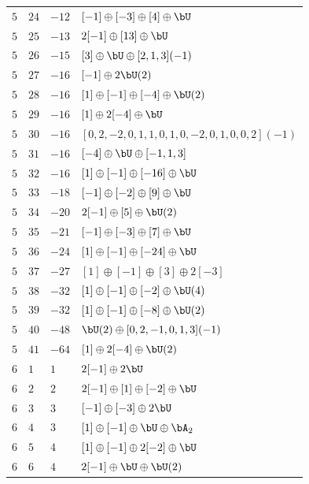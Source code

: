 \begin{center}
\begin{longtable}{llll}
 \(5\) & \(24\) & \(-12\) & \([-1] \oplus [-3] \oplus [4] \oplus \bU\) \\
 \(5\) & \(25\) & \(-13\) & \(2 [-1] \oplus [13] \oplus \bU\) \\
 \(5\) & \(26\) & \(-15\) & \([3] \oplus \bU \oplus [2, 1, 3](-1)\) \\
 \(5\) & \(27\) & \(-16\) & \([-1] \oplus 2 \bU(2)\) \\
 \(5\) & \(28\) & \(-16\) & \([1] \oplus [-1] \oplus [-4] \oplus \bU(2)\) \\
 \(5\) & \(29\) & \(-16\) & \([1] \oplus 2 [-4] \oplus \bU\) \\
 \(5\) & \(30\) & \(-16\) & \([0, 2, -2, 0, 1, 1, 0, 1, 0, -2, 0, 1, 0, 0, 2](-1)\) \\
 \(5\) & \(31\) & \(-16\) & \([-4] \oplus \bU \oplus [-1, 1, 3]\) \\
 \(5\) & \(32\) & \(-16\) & \([1] \oplus [-1] \oplus [-16] \oplus \bU\) \\
 \(5\) & \(33\) & \(-18\) & \([-1] \oplus [-2] \oplus [9] \oplus \bU\) \\
 \(5\) & \(34\) & \(-20\) & \(2 [-1] \oplus [5] \oplus \bU(2)\) \\
 \(5\) & \(35\) & \(-21\) & \([-1] \oplus [-3] \oplus [7] \oplus \bU\) \\
 \(5\) & \(36\) & \(-24\) & \([1] \oplus [-1] \oplus [-24] \oplus \bU\) \\
 \(5\) & \(37\) & \(-27\) & \([1] \oplus [-1] \oplus [3] \oplus 2[-3]\) \\
 \(5\) & \(38\) & \(-32\) & \([1] \oplus [-1] \oplus [-2] \oplus \bU(4)\) \\
 \(5\) & \(39\) & \(-32\) & \([1] \oplus [-1] \oplus [-8] \oplus \bU(2)\) \\
 \(5\) & \(40\) & \(-48\) & \(\bU(2) \oplus [0, 2, -1, 0, 1, 3](-1)\) \\
 \(5\) & \(41\) & \(-64\) & \([1] \oplus 2 [-4] \oplus \bU(2)\) \\
\midrule
 \(6\) & \(1\) & \(1\) & \(2 [-1] \oplus 2 \bU\) \\
 \(6\) & \(2\) & \(2\) & \(2 [-1] \oplus [1] \oplus [-2] \oplus \bU\) \\
 \(6\) & \(3\) & \(3\) & \([-1] \oplus [-3] \oplus 2 \bU\) \\
 \(6\) & \(4\) & \(3\) & \([1] \oplus [-1] \oplus \bU \oplus \bA_{2}\) \\
 \(6\) & \(5\) & \(4\) & \([1] \oplus [-1] \oplus 2 [-2] \oplus \bU\) \\
 \(6\) & \(6\) & \(4\) & \(2 [-1] \oplus \bU \oplus \bU(2)\) \\

\end{longtable}
\end{center}

